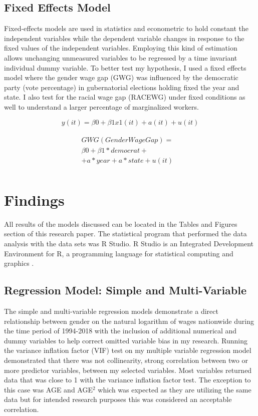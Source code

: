 \documentclass[12pt, English]{article}
\begin{document}
\subsection*{Fixed Effects Model}
 Fixed-effects models are used in statistics and econometric to hold constant the independent variables while the dependent variable changes in response to the fixed values of the independent variables. Employing this kind of estimation allows unchanging unmeasured variables to be regressed by a time invariant individual dummy variable. To better test my hypothesis, I used a fixed effects model where the gender wage gap (GWG) was influenced by the democratic party (vote percentage) in gubernatorial elections holding fixed the year and state. I also test for the racial wage gap (RACEWG) under fixed conditions as well to understand a larger percentage of marginalized workers. 

\begin{equation}
    y(it) = \beta0 + \beta1x1(it)+ a(it)+ u(it)
\end{equation}

\begin{equation}
\begin{aligned}
\begin{split}
GWG (Gender Wage Gap)= 
& \\\beta0 + \beta1*democrat+ \\
    + a*year + a*state + u(it) \\
\end{split}
\end{aligned}
\end{equation}



\newpage
\section{Findings}
All results of the models discussed can be located in the Tables and Figures section of this research paper. The statistical program that performed the data analysis with the data sets was R Studio. R Studio is an Integrated Development Environment for R, a programming language for statistical computing and graphics \citep{R}. 

\subsection*{Regression Model: Simple and Multi-Variable}
The simple and multi-variable regression models  demonstrate a direct relationship between gender on the natural logarithm of wages nationwide during the time period of 1994-2018 with the inclusion of additional numerical and dummy variables to help correct omitted variable bias in my research. Running the variance inflation factor (VIF) test on my multiple variable regression model demonstrated that there was not collinearity, strong correlation between two or more predictor variables, between my selected variables. Most variables returned data that was close to 1 with the variance inflation factor test. The exception to this case was AGE and AGE$^2$ which was expected as they are utilizing the same data but for intended research purposes this was considered an acceptable correlation.
\end{document}
